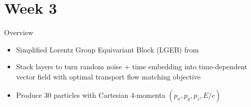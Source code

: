 \documentclass[handout, aspectratio=169,xcolor=dvipsnames]{beamer}
\begin{document}
\section{Week 3}

\begin{frame}{Overview}
\begin{itemize}
    \item Simplified Lorentz Group Equivariant Block (LGEB) from \cite{gongEfficientLorentzEquivariant2022}
    \item Stack layers to turn random noise + time embedding into time-dependent vector field with optimal transport flow matching objective
    \item Produce 30 particles with Cartesian 4-momenta $(p_x, p_y, p_z, E/c)$
\end{itemize}
\end{frame}
\end{document}
